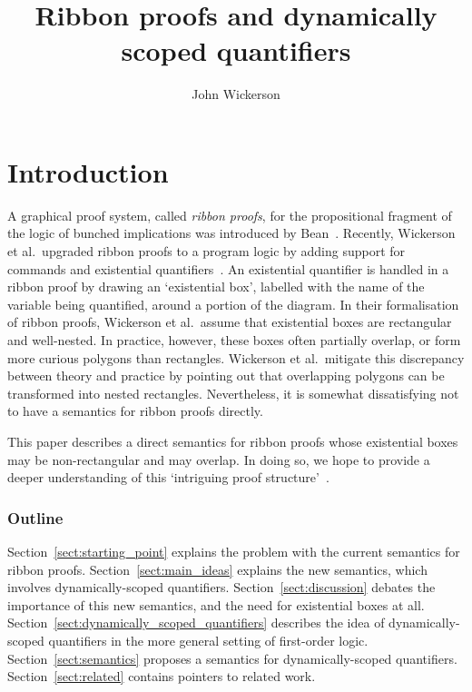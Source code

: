 \documentclass[svgnames]{llncs}
\begin{document}
\title{Ribbon proofs and dynamically scoped quantifiers}

\author{John Wickerson}

\maketitle

\newcommand{\ml}[2][t]{\mbox{\mdseries\begin{tabular}[#1]{@{}L@{}}#2\end{tabular}}}
\renewcommand{\ran}{\mathop{\rm ran}}



\section{Introduction}

A graphical proof system, called \emph{ribbon proofs}, for the propositional fragment of the logic of bunched implications was introduced by Bean~\cite{bean06}. Recently, Wickerson et al.\ upgraded ribbon proofs to a program logic by adding support for commands and existential quantifiers~\cite{wickerson+13}. An existential quantifier is handled in a ribbon proof by drawing an `existential box', labelled with the name of the variable being quantified, around a portion of the diagram. In their formalisation of ribbon proofs, Wickerson et al.\ assume that existential boxes are rectangular and well-nested. In practice, however, these boxes often partially overlap, or form more curious polygons than rectangles. Wickerson et al.\ mitigate this discrepancy between theory and practice by pointing out that overlapping polygons can be transformed into nested rectangles. Nevertheless, it is somewhat dissatisfying not to have a semantics for ribbon proofs directly. 

This paper describes a direct semantics for ribbon proofs whose existential boxes may be non-rectangular and may overlap. In doing so, we hope to provide a deeper understanding of this `intriguing proof structure'~\cite{wickerson+13}.

\subsubsection*{Outline} Section~\ref{sect:starting_point} explains the problem with the current semantics for ribbon proofs. Section~\ref{sect:main_ideas} explains the new semantics, which involves dynamically-scoped quantifiers. Section~\ref{sect:discussion} debates the importance of this new semantics, and the need for existential boxes at all. Section~\ref{sect:dynamically_scoped_quantifiers} describes the idea of dynamically-scoped quantifiers in the more general setting of first-order logic. Section~\ref{sect:semantics} proposes a semantics for dynamically-scoped quantifiers. Section~\ref{sect:related} contains pointers to related work. 
\end{document}
